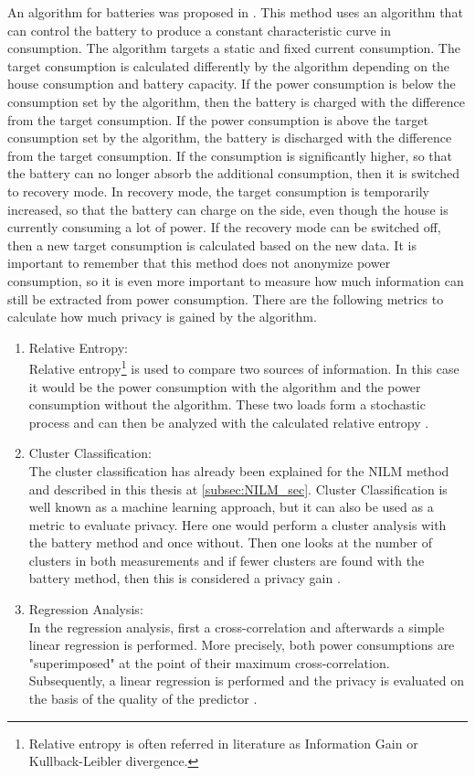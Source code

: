 An algorithm for batteries was proposed in \cite{mclaughlin2011protecting}. This method uses an algorithm that can control the battery to produce a constant characteristic curve in consumption. The algorithm targets a static and fixed current consumption. The target consumption is calculated differently by the algorithm depending on the house consumption and battery capacity. If the power consumption is below the consumption set by the algorithm, then the battery is charged with the difference from the target consumption. If the power consumption is above the target consumption set by the algorithm, the battery is discharged with the difference from the target consumption. If the consumption is significantly higher, so that the battery can no longer absorb the additional consumption, then it is switched to recovery mode. In recovery mode, the target consumption is temporarily increased, so that the battery can charge on the side, even though the house is currently consuming a lot of power. If the recovery mode can be switched off, then a new target consumption is calculated based on the new data. It is important to remember that this method does not anonymize power consumption, so it is even more important to measure how much information can still be extracted from power consumption. There are the following metrics to calculate how much privacy is gained by the algorithm.
\begin{enumerate}
\label{subsec:information_gain}
\item Relative Entropy:\\
Relative entropy\footnote[2]{Relative entropy is often referred in literature as Information Gain or Kullback-Leibler divergence.} is used to compare two sources of information. In this case it would be the power consumption with the algorithm and the power consumption without the algorithm. These two loads form a stochastic process and can then be analyzed with the calculated relative entropy \cite{kalogridis2011affordable}. 
\item Cluster Classification:\\
The cluster classification has already been explained for the \gls{NILM} method and described in this thesis at \ref{subsec:NILM_sec}. Cluster Classification is well known as a machine learning approach, but it can also be used as a metric to evaluate privacy. Here one would perform a cluster analysis with the battery method and once without. Then one looks at the number of clusters in both measurements and if fewer clusters are found with the battery method, then this is considered a privacy gain \cite{kalogridis2010privacy}.
\item Regression Analysis:\\
In the regression analysis, first a cross-correlation and afterwards a simple linear regression is performed. More precisely, both power consumptions are "superimposed" at the point of their maximum cross-correlation. Subsequently, a linear regression is performed and the privacy is evaluated on the basis of the quality of the predictor \cite{mclaughlin2011protecting}.
\end{enumerate}
